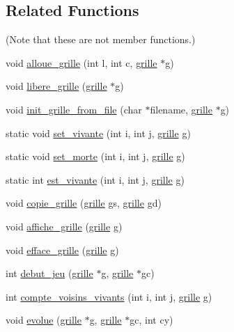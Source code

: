 \subsection*{Related Functions}
(Note that these are not member functions.) \begin{DoxyCompactItemize}
\item 
void \hyperlink{structgrille_ae621f51c60aa4fafaa0c9f6c9b5a4036}{alloue\+\_\+grille} (int l, int c, \hyperlink{structgrille}{grille} $\ast$g)
\item 
void \hyperlink{structgrille_a7074b2b15576e9d2b3cd15c3a1dc7012}{libere\+\_\+grille} (\hyperlink{structgrille}{grille} $\ast$g)
\item 
void \hyperlink{structgrille_adf5501cc0bbad28f5ffc561d92197e4e}{init\+\_\+grille\+\_\+from\+\_\+file} (char $\ast$filename, \hyperlink{structgrille}{grille} $\ast$g)
\item 
static void \hyperlink{structgrille_a32d986d81f64f5bf9a58653accac0310}{set\+\_\+vivante} (int i, int j, \hyperlink{structgrille}{grille} g)
\item 
static void \hyperlink{structgrille_a10e7b11f2de74ccf95ad1fcb3671a163}{set\+\_\+morte} (int i, int j, \hyperlink{structgrille}{grille} g)
\item 
static int \hyperlink{structgrille_aac3db82b0f857dc49ccd51628cbc231b}{est\+\_\+vivante} (int i, int j, \hyperlink{structgrille}{grille} g)
\item 
void \hyperlink{structgrille_a63b3ae16c86b568f6aa8f9ce84128b1e}{copie\+\_\+grille} (\hyperlink{structgrille}{grille} gs, \hyperlink{structgrille}{grille} gd)
\item 
void \hyperlink{structgrille_a90cb8ec05374b46d9995705ed4954f34}{affiche\+\_\+grille} (\hyperlink{structgrille}{grille} g)
\item 
void \hyperlink{structgrille_ab36a6f8957cd3e682119007836ce6ad5}{efface\+\_\+grille} (\hyperlink{structgrille}{grille} g)
\item 
int \hyperlink{structgrille_ae2f614cbe876c55ee26d1d0059f92a3c}{debut\+\_\+jeu} (\hyperlink{structgrille}{grille} $\ast$g, \hyperlink{structgrille}{grille} $\ast$gc)
\item 
int \hyperlink{structgrille_adf9adf6ee75bcfbe164ac465ca5e4f82}{compte\+\_\+voisins\+\_\+vivants} (int i, int j, \hyperlink{structgrille}{grille} g)
\item 
void \hyperlink{structgrille_a36a600ac4a0aa461ca212614a9ba4260}{evolue} (\hyperlink{structgrille}{grille} $\ast$g, \hyperlink{structgrille}{grille} $\ast$gc, int cy)
\end{DoxyCompactItemize}


